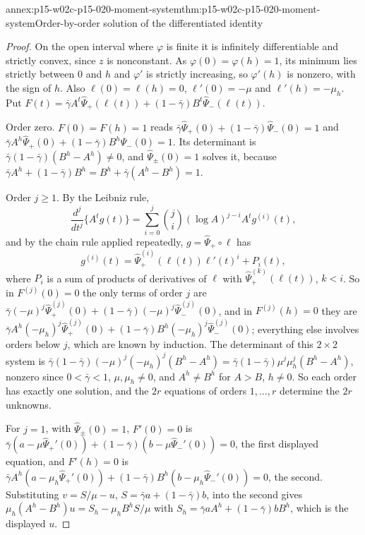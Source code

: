 \begin{annexitem}{annex:p15-w02c-p15-020-moment-system}{thm:p15-w02c-p15-020-moment-system}{Order-by-order solution of the differentiated identity}
\begin{proof}
On the open interval where \(\varphi\) is finite it is infinitely
differentiable and strictly convex, since \(z\) is nonconstant. As
\(\varphi(0)=\varphi(h)=1\), its minimum lies strictly between \(0\)
and \(h\) and \(\varphi'\) is strictly increasing, so \(\varphi'(h)\)
is nonzero, with the sign of \(h\). Also \(\ell(0)=\ell(h)=0\),
\(\ell'(0)=-\mu\) and \(\ell'(h)=-\mu_h\). Put
\(F(t)=\bar\gamma A^t\widehat\Psi_+(\ell(t))+(1-\bar\gamma)B^t\widehat\Psi_-(\ell(t))\).

Order zero. \(F(0)=F(h)=1\) reads
\(\bar\gamma\widehat\Psi_+(0)+(1-\bar\gamma)\widehat\Psi_-(0)=1\) and
\(\bar\gamma A^h\widehat\Psi_+(0)+(1-\bar\gamma)B^h\widehat\Psi_-(0)=1\).
Its determinant is \(\bar\gamma(1-\bar\gamma)(B^h-A^h)\neq0\), and
\(\widehat\Psi_\pm(0)=1\) solves it, because
\(\bar\gamma A^h+(1-\bar\gamma)B^h=B^h+\bar\gamma(A^h-B^h)=1\).

Order \(j\geq1\). By the Leibniz rule,
\[
 \frac{d^j}{dt^j}\{A^tg(t)\}=\sum_{i=0}^j\binom ji(\log A)^{j-i}A^tg^{(i)}(t),
\]
and by the chain rule applied repeatedly, \(g=\widehat\Psi_+\circ\ell\)
has
\[
 g^{(i)}(t)=\widehat\Psi_+^{(i)}(\ell(t))\ell'(t)^i+P_i(t),
\]
where
\(P_i\) is a sum of products of derivatives of \(\ell\) with
\(\widehat\Psi_+^{(k)}(\ell(t))\), \(k<i\). So in \(F^{(j)}(0)=0\) the
only terms of order \(j\) are
\(\bar\gamma(-\mu)^j\widehat\Psi_+^{(j)}(0)+(1-\bar\gamma)(-\mu)^j\widehat\Psi_-^{(j)}(0)\),
and in \(F^{(j)}(h)=0\) they are
\(\bar\gamma A^h(-\mu_h)^j\widehat\Psi_+^{(j)}(0)+(1-\bar\gamma)B^h(-\mu_h)^j\widehat\Psi_-^{(j)}(0)\);
everything else involves orders below \(j\), which are known by
induction. The determinant of this \(2\times2\) system is
\(\bar\gamma(1-\bar\gamma)(-\mu)^j(-\mu_h)^j(B^h-A^h)
=\bar\gamma(1-\bar\gamma)\mu^j\mu_h^j(B^h-A^h)\), nonzero since
\(0<\bar\gamma<1\), \(\mu,\mu_h\neq0\), and \(A^h\neq B^h\) for
\(A>B\), \(h\neq0\). So each order has exactly one solution, and the
\(2r\) equations of orders \(1,\ldots,r\) determine the \(2r\)
unknowns.

For \(j=1\), with \(\widehat\Psi_\pm(0)=1\), \(F'(0)=0\) is
\(\bar\gamma(a-\mu\widehat\Psi_+'(0))+(1-\bar\gamma)(b-\mu\widehat\Psi_-'(0))=0\),
the first displayed equation, and \(F'(h)=0\) is
\(\bar\gamma A^h(a-\mu_h\widehat\Psi_+'(0))+(1-\bar\gamma)B^h(b-\mu_h\widehat\Psi_-'(0))=0\),
the second. Substituting \(v=S/\mu-u\), \(S=\bar\gamma a+(1-\bar\gamma)b\),
into the second gives \(\mu_h(A^h-B^h)u=S_h-\mu_hB^hS/\mu\) with
\(S_h=\bar\gamma aA^h+(1-\bar\gamma)bB^h\), which is the displayed
\(u\).
\end{proof}
\end{annexitem}

